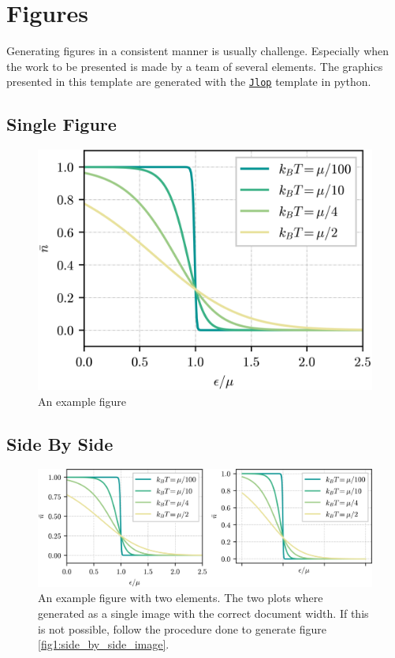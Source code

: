 \section{Figures}

Generating figures in a consistent manner is usually challenge. Especially when the work to be presented is made by a team of several elements. The graphics presented in this template are generated with the \href{"aa"}{\texttt{Jlop}} template in python. 

\subsection*{Single Figure}

\begin{figure}[!ht]
	\centering
	\includegraphics{figures/chapter_B/jlop_sc_sqroot.png}
	\caption{An example figure}
	\label{fig1:single_image}
\end{figure}

\pagebreak
\subsection*{Side By Side}

\begin{figure}[!ht]
	\centering
	\includegraphics{figures/chapter_B/jlop_dc_golden.png}
	\caption{An example figure with two elements. The two plots where generated as a single image with the correct document width. If this is not possible, follow the procedure done to generate figure \ref{fig1:side_by_side_image}.}
	\label{fig1:side_by_side_single}
\end{figure}


